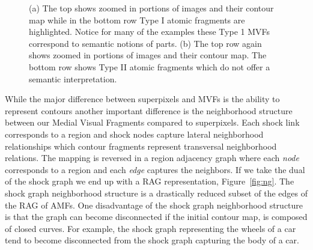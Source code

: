 \begin{figure}[!ht]
\caption{(a) The top shows zoomed in portions of images and their contour map while in the bottom row Type I atomic fragments are highlighted. Notice for many of the examples these Type 1 MVFs correspond to semantic notions of parts. (b) The top row again shows zoomed in portions of images and their contour map. The bottom row shows Type II atomic fragments which do not offer a semantic interpretation. }
\label{fig:atomic_frag_zoomin}
\end{figure}





While the major difference between superpixels and MVFs is the ability to represent contours another important difference is the neighborhood structure between our Medial Visual Fragments compared to superpixels. Each shock link corresponds to a region and shock nodes capture lateral neighborhood relationships which contour fragments represent transversal neighborhood relations.  The mapping is reversed in a region adjacency graph where each \emph{node} corresponds to a region and each \emph{edge} captures the neighbors. If we take the dual of the shock graph we end up with a RAG representation, Figure~\ref{fig:ng}.  The shock graph neighborhood structure is a drastically reduced subset of the edges of the RAG of AMFs. One disadvantage of the shock graph neighborhood structure is that the graph can become disconnected if the initial contour map, is composed of closed curves. For example, the shock graph representing the wheels of a car tend to become disconnected from the shock graph capturing the body of a car.

